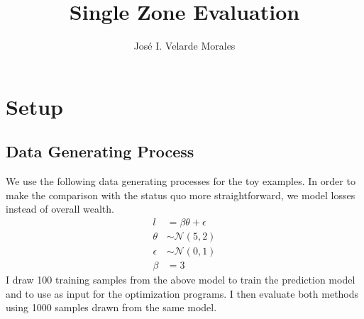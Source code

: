 \documentclass[11pt]{article}
\title{Single Zone Evaluation}
\author{José I. Velarde Morales}
\begin{document}
\maketitle

\section{Setup}
    \subsection*{Data Generating Process}
    We use the following data generating processes for the toy examples. In order to make the comparison with the status quo more straightforward, we model losses instead of overall wealth. 
    \begin{align*}
        l&=\beta \theta + \epsilon\\
        \theta &\sim \mathcal{N}(5,2)\\
        \epsilon &\sim \mathcal{N}(0,1)\\
        \beta &= 3
    \end{align*}
    I draw 100 training samples from the above model to train the prediction model and to use as input for the optimization programs. I then evaluate both methods using 1000 samples drawn from the same model. 
\end{document}
